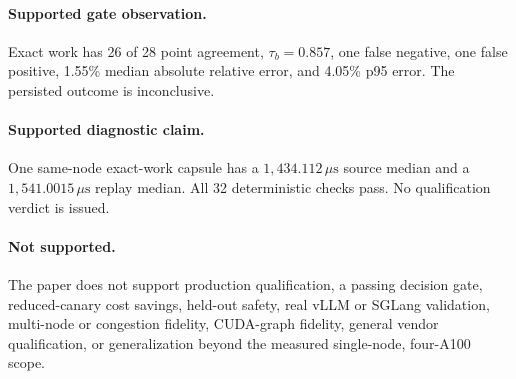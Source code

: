 \documentclass[10pt,twocolumn]{article}
\newcommand{\us}{\,\mu\mathrm{s}}
\begin{document}
\paragraph{Supported gate observation.} Exact work has 26 of 28 point
agreement, $\tau_b=0.857$, one false negative, one false positive, 1.55\%
median absolute relative error, and 4.05\% p95 error. The persisted outcome is
inconclusive.

\paragraph{Supported diagnostic claim.} One same-node exact-work capsule has a
$1{,}434.112\us$ source median and a $1{,}541.0015\us$ replay median. All 32
deterministic checks pass. No qualification verdict is issued.

\paragraph{Not supported.} The paper does not support production
qualification, a passing decision gate, reduced-canary cost savings, held-out
safety, real vLLM or SGLang validation, multi-node or congestion fidelity,
CUDA-graph fidelity, general vendor qualification, or generalization beyond the
measured single-node, four-A100 scope.
\end{document}
